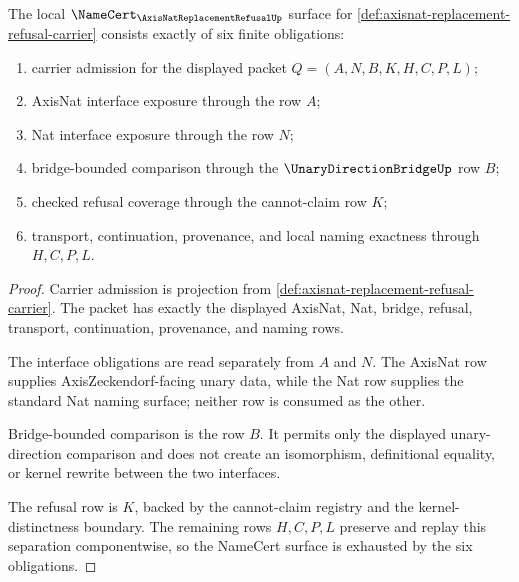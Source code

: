 \begin{theorem}
\label{thm:axisnat-replacement-refusal-namecert-obligations}
The local $\NameCert_{\AxisNatReplacementRefusalUp}$ surface for \autoref{def:axisnat-replacement-refusal-carrier} consists exactly of six finite obligations:
\begin{enumerate}
\item carrier admission for the displayed packet $Q=(A,N,B,K,H,C,P,L)$;
\item AxisNat interface exposure through the row $A$;
\item Nat interface exposure through the row $N$;
\item bridge-bounded comparison through the $\UnaryDirectionBridgeUp$ row $B$;
\item checked refusal coverage through the cannot-claim row $K$;
\item transport, continuation, provenance, and local naming exactness through $H,C,P,L$.
\end{enumerate}
\end{theorem}
\begin{proof}
Carrier admission is projection from \autoref{def:axisnat-replacement-refusal-carrier}. The packet has exactly the displayed AxisNat, Nat, bridge, refusal, transport, continuation, provenance, and naming rows.

The interface obligations are read separately from $A$ and $N$. The AxisNat row supplies AxisZeckendorf-facing unary data, while the Nat row supplies the standard Nat naming surface; neither row is consumed as the other.

Bridge-bounded comparison is the row $B$. It permits only the displayed unary-direction comparison and does not create an isomorphism, definitional equality, or kernel rewrite between the two interfaces.

The refusal row is $K$, backed by the cannot-claim registry and the kernel-distinctness boundary. The remaining rows $H,C,P,L$ preserve and replay this separation componentwise, so the NameCert surface is exhausted by the six obligations.
\end{proof}

